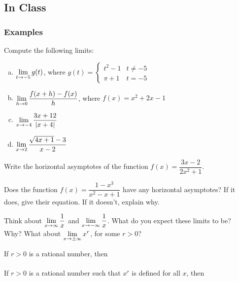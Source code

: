 \documentclass[notes]{subfiles}
\begin{document}
	\subsection*{In Class}
	\subsubsection*{Examples}
		\begin{ex}
			Compute the following limits:
			\begin{enumerate}[(a)]
				\item \(\displaystyle \lim_{t\to -5} g(t)\), where \(g(t) = \begin{cases}t^2 -1 & t\neq -5\\ \pi+1 & t = -5 \end{cases}\)
					
				\item \(\displaystyle \lim_{h\to 0} \dfrac{f(x+h)-f(x)}{h}\), where \(f(x) = x^2+2x-1\)
					
				\item \(\displaystyle \lim_{x\to -4} \dfrac{3x + 12}{|x + 4|}\)

				\item \(\displaystyle \lim_{x\to 2} \dfrac{\sqrt{4x+1} - 3}{x-2}\)

			\end{enumerate}
		\end{ex}
			\newpage
		
		\begin{ex}
			Write the horizontal asymptotes of the function  \(f(x) =\dfrac{3x-2}{2x^2+1}\).
		\end{ex}
			\vs{1}
				
		\begin{ex}
			Does the function \(f(x) = \dfrac{1-x^3}{x^2-x+1}\) have any horizontal asymptotes?  If it does, give their equation.  If it doesn't, explain why.
		\end{ex}
			\vs{1}

		\begin{question}
			Think about \(\displaystyle \lim_{x\to\infty} \dfrac{1}{x}\) and \(\displaystyle \lim_{x\to -\infty} \dfrac{1}{x}\).  What do you expect these limits to be?\\[5pt]  Why?  What about \(\displaystyle \lim_{x\to \pm \infty} x^r\), for some \(r > 0\)?
		\end{question}
			\vs{1}
			\newpage
			
		\begin{rmk}[Theorem]
			If \(r > 0\) is a rational number, then 
					\vspace{.75in} \\ \\
			If \(r > 0\) is a rational number such that \(x^r\) is defined for all \(x\), then
					\vspace{.75in}
		\end{rmk}
		
\end{document}
